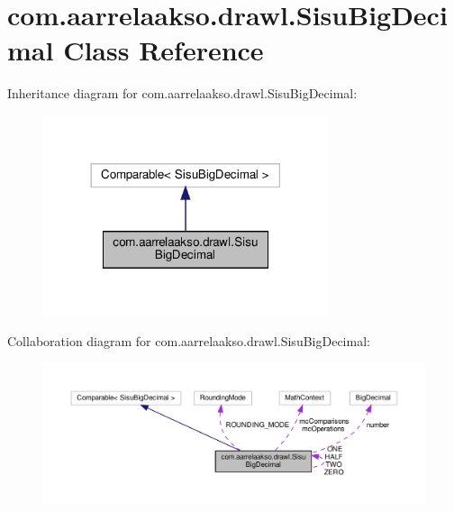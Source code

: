 \hypertarget{classcom_1_1aarrelaakso_1_1drawl_1_1_sisu_big_decimal}{}\section{com.\+aarrelaakso.\+drawl.\+Sisu\+Big\+Decimal Class Reference}
\label{classcom_1_1aarrelaakso_1_1drawl_1_1_sisu_big_decimal}


Inheritance diagram for com.\+aarrelaakso.\+drawl.\+Sisu\+Big\+Decimal\+:\nopagebreak
\begin{figure}[H]
\begin{center}
\leavevmode
\includegraphics[width=237pt]{classcom_1_1aarrelaakso_1_1drawl_1_1_sisu_big_decimal__inherit__graph}
\end{center}
\end{figure}


Collaboration diagram for com.\+aarrelaakso.\+drawl.\+Sisu\+Big\+Decimal\+:\nopagebreak
\begin{figure}[H]
\begin{center}
\leavevmode
\includegraphics[width=350pt]{classcom_1_1aarrelaakso_1_1drawl_1_1_sisu_big_decimal__coll__graph}
\end{center}
\end{figure}
